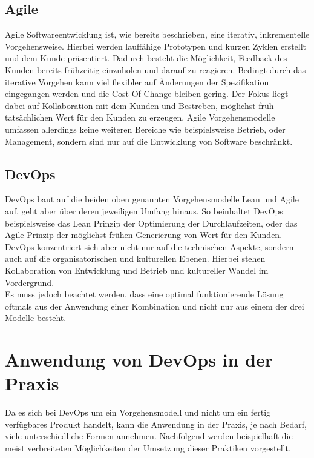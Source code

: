 \subsection{Agile}
Agile Softwareentwicklung ist, wie bereits beschrieben, eine iterativ, inkrementelle Vorgehensweise. Hierbei werden lauffähige Prototypen und kurzen Zyklen erstellt und dem Kunde präsentiert. Dadurch besteht die Möglichkeit, Feedback des Kunden bereits frühzeitig einzuholen und darauf zu reagieren. \parencite[Vgl.][S. 62]{Schatten:2010aa} Bedingt durch das iterative Vorgehen kann viel flexibler auf Änderungen der Spezifikation eingegangen werden und die Cost Of Change bleiben gering. Der Fokus liegt dabei auf Kollaboration mit dem Kunden und Bestreben, möglichst früh tatsächlichen Wert für den Kunden zu erzeugen. Agile Vorgehensmodelle umfassen allerdings keine weiteren Bereiche wie beispielsweise Betrieb, oder Management, sondern sind nur auf die Entwicklung von Software beschränkt.

\subsection{DevOps}
DevOps baut auf die beiden oben genannten Vorgehensmodelle Lean und Agile auf, geht aber über deren jeweiligen Umfang hinaus. So beinhaltet DevOps beispielsweise das Lean Prinzip der Optimierung der Durchlaufzeiten, oder das Agile Prinzip der möglichst frühen Generierung von Wert für den Kunden. DevOps konzentriert sich aber nicht nur auf die technischen Aspekte, sondern auch auf die organisatorischen und kulturellen Ebenen. Hierbei stehen Kollaboration von Entwicklung und Betrieb und kultureller Wandel im Vordergrund.\\
Es muss jedoch beachtet werden, dass eine optimal funktionierende Lösung oftmals aus der Anwendung einer Kombination und nicht nur aus einem der drei Modelle besteht.

\newpage
\section{Anwendung von DevOps in der Praxis} %
Da es sich bei DevOps um ein Vorgehensmodell und nicht um ein fertig verfügbares Produkt handelt, kann die Anwendung in der Praxis, je nach Bedarf, viele unterschiedliche Formen annehmen. Nachfolgend werden beispielhaft die meist verbreiteten Möglichkeiten der Umsetzung dieser Praktiken vorgestellt.

